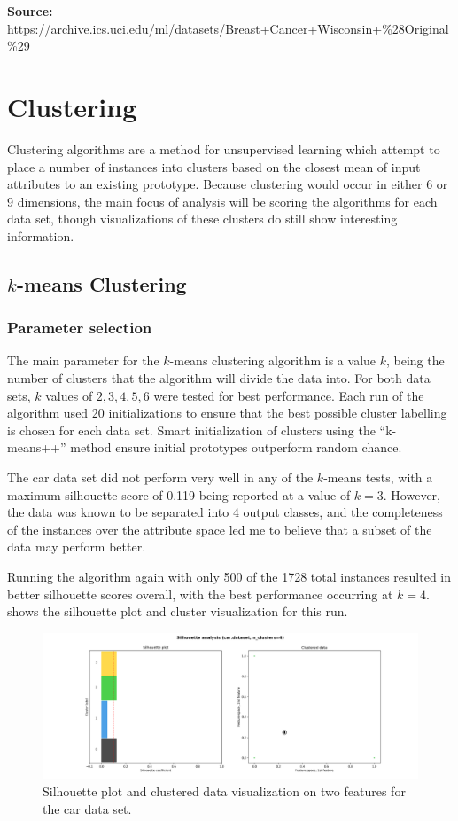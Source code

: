 \documentclass{article}
\begin{document}
      \textbf{Source:} https://archive.ics.uci.edu/ml/datasets/Breast+Cancer+Wisconsin+\%28Original\%29

  \section{Clustering}
    Clustering algorithms are a method for unsupervised learning which attempt to place a number of instances into clusters based on the closest mean of input attributes to an existing prototype. Because clustering would occur in either 6 or 9 dimensions, the main focus of analysis will be scoring the algorithms for each data set, though visualizations of these clusters do still show interesting information.

    \subsection{$k$-means Clustering}
      \subsubsection{Parameter selection}
        The main parameter for the $k$-means clustering algorithm is a value $k$, being the number of clusters that the algorithm will divide the data into. For both data sets, $k$ values of $2, 3, 4, 5, 6$ were tested for best performance. Each run of the algorithm used 20 initializations to ensure that the best possible cluster labelling is chosen for each data set. Smart initialization of clusters using the ``k-means++'' method ensure initial prototypes outperform random chance.

        The car data set did not perform very well in any of the $k$-means tests, with a maximum silhouette score of 0.119 being reported at a value of $k=3$. However, the data was known to be separated into 4 output classes, and the completeness of the instances over the attribute space led me to believe that a subset of the data may perform better.

        Running the algorithm again with only 500 of the 1728 total instances resulted in better silhouette scores overall, with the best performance occurring at $k=4$.  shows the silhouette plot and cluster visualization for this run.

        \begin{figure}[htb]
        \centering
        \includegraphics[width=\linewidth]{out/kmeans/car-4-clusters.png}
        \caption{Silhouette plot and clustered data visualization on two features for the car data set.}
        \label{fig:km-silhouette-car}
        \end{figure}
\end{document}
